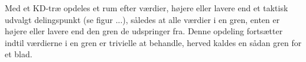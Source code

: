 Med et KD-træ opdeles et rum efter værdier, højere eller lavere end et taktisk udvalgt delingspunkt (se figur ...),
således at alle værdier i en gren, enten er højere eller lavere end den gren de udspringer fra. Denne  opdeling fortsætter indtil værdierne i en gren er trivielle at behandle, herved kaldes en sådan gren for et blad.
